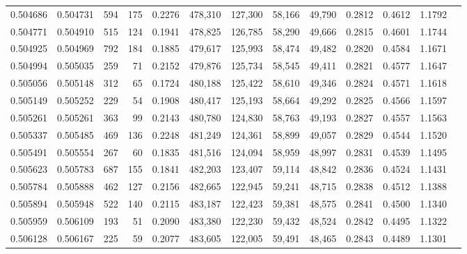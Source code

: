 \begin{tabular}{rrrrrrrrrrrrr}
0.504686 & 0.504731 &   594 &   175 &                                     0.2276 & 478,310 & 127,300 &  58,166 &  49,790 & 0.2812 & 0.4612 & 1.1792 \\
0.504771 & 0.504910 &   515 &   124 &                                     0.1941 & 478,825 & 126,785 &  58,290 &  49,666 & 0.2815 & 0.4601 & 1.1744 \\
0.504925 & 0.504969 &   792 &   184 &                                     0.1885 & 479,617 & 125,993 &  58,474 &  49,482 & 0.2820 & 0.4584 & 1.1671 \\
0.504994 & 0.505035 &   259 &    71 &                                     0.2152 & 479,876 & 125,734 &  58,545 &  49,411 & 0.2821 & 0.4577 & 1.1647 \\
0.505056 & 0.505148 &   312 &    65 &                                     0.1724 & 480,188 & 125,422 &  58,610 &  49,346 & 0.2824 & 0.4571 & 1.1618 \\
0.505149 & 0.505252 &   229 &    54 &                                     0.1908 & 480,417 & 125,193 &  58,664 &  49,292 & 0.2825 & 0.4566 & 1.1597 \\
0.505261 & 0.505261 &   363 &    99 &                                     0.2143 & 480,780 & 124,830 &  58,763 &  49,193 & 0.2827 & 0.4557 & 1.1563 \\
0.505337 & 0.505485 &   469 &   136 &                                     0.2248 & 481,249 & 124,361 &  58,899 &  49,057 & 0.2829 & 0.4544 & 1.1520 \\
0.505491 & 0.505554 &   267 &    60 &                                     0.1835 & 481,516 & 124,094 &  58,959 &  48,997 & 0.2831 & 0.4539 & 1.1495 \\
0.505623 & 0.505783 &   687 &   155 &                                     0.1841 & 482,203 & 123,407 &  59,114 &  48,842 & 0.2836 & 0.4524 & 1.1431 \\
0.505784 & 0.505888 &   462 &   127 &                                     0.2156 & 482,665 & 122,945 &  59,241 &  48,715 & 0.2838 & 0.4512 & 1.1388 \\
0.505894 & 0.505948 &   522 &   140 &                                     0.2115 & 483,187 & 122,423 &  59,381 &  48,575 & 0.2841 & 0.4500 & 1.1340 \\
0.505959 & 0.506109 &   193 &    51 &                                     0.2090 & 483,380 & 122,230 &  59,432 &  48,524 & 0.2842 & 0.4495 & 1.1322 \\
0.506128 & 0.506167 &   225 &    59 &                                     0.2077 & 483,605 & 122,005 &  59,491 &  48,465 & 0.2843 & 0.4489 & 1.1301 \\

\end{tabular}
